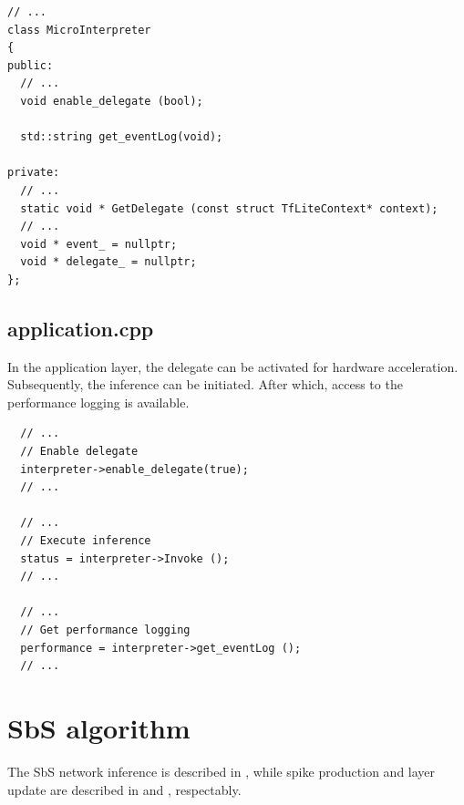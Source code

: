 \begin{verbatim}
// ...
class MicroInterpreter
{
public:
  // ...
  void enable_delegate (bool);

  std::string get_eventLog(void);

private:
  // ...
  static void * GetDelegate (const struct TfLiteContext* context);
  // ...
  void * event_ = nullptr;
  void * delegate_ = nullptr;
};
\end{verbatim}

\subsection*{application.cpp}
In the application layer, the delegate can be activated for hardware acceleration. Subsequently, the inference can be initiated. After which, access to the performance logging is available.
\begin{verbatim}
  // ...
  // Enable delegate
  interpreter->enable_delegate(true);
  // ...

  // ...
  // Execute inference
  status = interpreter->Invoke ();
  // ...
  
  // ...
  // Get performance logging
  performance = interpreter->get_eventLog ();
  // ...
\end{verbatim}


\FloatBarrier
\section{SbS algorithm}
\label{chap:appendix}
The SbS network inference is described in , while spike production and layer update are described in  and , respectably.

